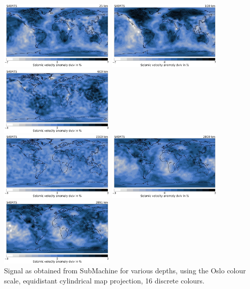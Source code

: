 \begin{center}
\includegraphics[width=5.5cm]{python_codes/fieldstone_85/images/submachine/submachine_S40RTS_25km_SMALL.jpg}
\includegraphics[width=5.5cm]{python_codes/fieldstone_85/images/submachine/submachine_S40RTS_100km_SMALL.jpg}
\includegraphics[width=5.5cm]{python_codes/fieldstone_85/images/submachine/submachine_S40RTS_600km_SMALL.jpg}\\
\includegraphics[width=5.5cm]{python_codes/fieldstone_85/images/submachine/submachine_S40RTS_1500km_SMALL.jpg}
\includegraphics[width=5.5cm]{python_codes/fieldstone_85/images/submachine/submachine_S40RTS_2800km_SMALL.jpg}
\includegraphics[width=5.5cm]{python_codes/fieldstone_85/images/submachine/submachine_S40RTS_2891km_SMALL.jpg}\\
{\captionfont Signal as obtained from SubMachine for various depths, using the Oslo colour scale, equidistant cylindrical map projection, 
16 discrete colours.}
\end{center}



